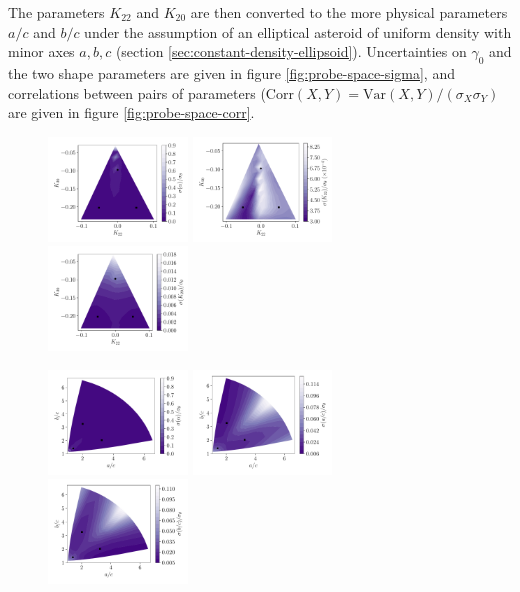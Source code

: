 \documentclass{aastex631}
\begin{document}
The parameters $K_{22}$ and $K_{20}$ are then converted to the more physical parameters $a/c$ and $b/c$ under the assumption of an elliptical asteroid of uniform density with minor axes $a, b, c$ (section \ref{sec:constant-density-ellipsoid}). Uncertainties on $\gamma_0$ and the two shape parameters are given in figure \ref{fig:probe-space-sigma}, and correlations between pairs of parameters ($\mathrm{Corr}(X, Y) = \mathrm{Var}(X, Y) / (\sigma_X \sigma_Y)$ are given in figure \ref{fig:probe-space-corr}. 
\begin{figure}
  \includegraphics[width=0.33\textwidth]{probe-space-theta-1-sigma.pdf}\hfill
  \includegraphics[width=0.33\textwidth]{probe-space-theta-2-sigma.pdf}\hfill
  \includegraphics[width=0.33\textwidth]{probe-space-theta-3-sigma.pdf}

  \includegraphics[width=0.33\textwidth]{probe-space-ab-1-sigma.pdf}\hfill
  \includegraphics[width=0.33\textwidth]{probe-space-ab-a-sigma.pdf}\hfill
  \includegraphics[width=0.33\textwidth]{probe-space-ab-b-sigma.pdf}


\end{figure}
\end{document}
